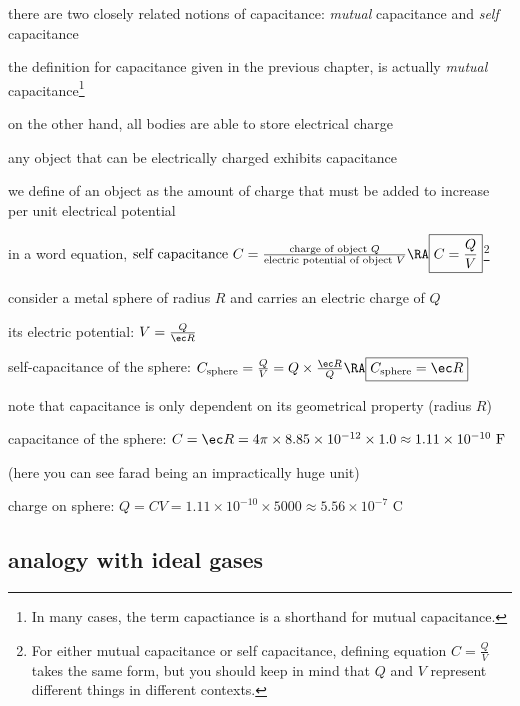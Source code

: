 there are two closely related notions of capacitance: \emph{mutual} capacitance and \emph{self} capacitance

the definition for capacitance given in the previous chapter, is actually \emph{mutual} capacitance\footnote{In many cases, the term capactiance is a shorthand for mutual capacitance.}

on the other hand, all bodies are able to store electrical charge

any object that can be electrically charged exhibits capacitance

we define  of an object as the amount of charge that must be added to increase per unit electrical potential

in a word equation, $ \text{self capacitance }C=\frac{\text{charge of object }Q}{\text{electric potential of object }V} \RA \boxed{C=\frac{Q}{V}}$\footnote{For either mutual capacitance or self capacitance, defining equation $C=\frac{Q}{V}$ takes the same form, but you should keep in mind that $Q$ and $V$ represent different things in different contexts.}


consider a metal sphere of radius $R$ and carries an electric charge of $Q$

its electric potential: $V = \frac{Q}{\ec R}$

self-capacitance of the sphere: $C_\text{sphere} = \frac{Q}{V} = Q \times \frac{\ec R}{Q} \RA \boxed{C_\text{sphere} = \ec R}$

note that capacitance is only dependent on its geometrical property (radius $R$) \eoe


\sol capacitance of the sphere: $C = \ec R = 4\pi\times8.85\times10^{-12}\times 1.0 \approx 1.11\times10^{-10} \text{ F}$

(here you can see farad being an impractically huge unit)

charge on sphere: $Q = CV = 1.11\times10^{-10} \times 5000 \approx 5.56\times 10^{-7} \text{ C}$ \eoe

\subsection*{analogy with ideal gases}

